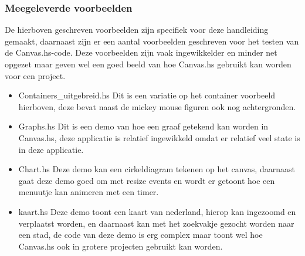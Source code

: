 

\subsubsection{Meegeleverde voorbeelden}
De hierboven geschreven voorbeelden zijn specifiek voor deze handleiding gemaakt, daarnaast zijn er een aantal voorbeelden geschreven voor het testen van de Canvas.hs-code. Deze voorbeelden zijn vaak ingewikkelder en minder net opgezet maar geven wel een goed beeld van hoe Canvas.hs gebruikt kan worden voor een project.

\begin{itemize}
    \item Containers\_uitgebreid.hs
Dit is een variatie op het container voorbeeld hierboven, deze bevat naast de mickey mouse figuren ook nog achtergronden.
    \item Graphs.hs
Dit is een demo van hoe een graaf getekend kan worden in Canvas.hs, deze applicatie is relatief ingewikkeld omdat er relatief veel state is in deze applicatie.
    \item Chart.hs
Deze demo kan een cirkeldiagram tekenen op het canvas, daarnaast gaat deze demo goed om met resize events en wordt er getoont hoe een menuutje kan animeren met een timer.
    \item kaart.hs
Deze demo toont een kaart van nederland, hierop kan ingezoomd en verplaatst worden, en daarnaast kan met het zoekvakje gezocht worden naar een stad, de code van deze demo is erg complex maar toont wel hoe Canvas.hs ook in grotere projecten gebruikt kan worden.
\end{itemize}

